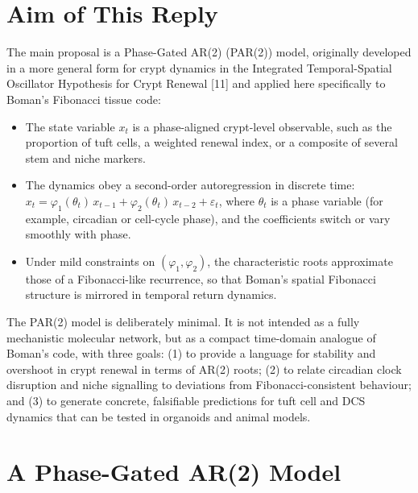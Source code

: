 \documentclass[]{interact}
\begin{document}
\section{Aim of This Reply}

The main proposal is a Phase-Gated AR(2) (PAR(2)) model, originally developed
in a more general form for crypt dynamics in the Integrated Temporal-Spatial
Oscillator Hypothesis for Crypt Renewal [11] and applied here specifically to
Boman's Fibonacci tissue code:

\begin{itemize}
  \item The state variable $x_t$ is a phase-aligned crypt-level observable,
        such as the proportion of tuft cells, a weighted renewal index, or a
        composite of several stem and niche markers.
  \item The dynamics obey a second-order autoregression in discrete time:
        $x_t = \varphi_1(\theta_t)\,x_{t-1} + \varphi_2(\theta_t)\,x_{t-2}
        + \varepsilon_t$, where $\theta_t$ is a phase variable (for example,
        circadian or cell-cycle phase), and the coefficients switch or vary
        smoothly with phase.
  \item Under mild constraints on $(\varphi_1, \varphi_2)$, the characteristic
        roots approximate those of a Fibonacci-like recurrence, so that Boman's
        spatial Fibonacci structure is mirrored in temporal return dynamics.
\end{itemize}

The PAR(2) model is deliberately minimal.
It is not intended as a fully mechanistic molecular network, but as a compact
time-domain analogue of Boman's code, with three goals:
(1) to provide a language for stability and overshoot in crypt renewal in
terms of AR(2) roots;
(2) to relate circadian clock disruption and niche signalling to deviations
from Fibonacci-consistent behaviour; and
(3) to generate concrete, falsifiable predictions for tuft cell and DCS
dynamics that can be tested in organoids and animal models.

\section{A Phase-Gated AR(2) Model}
\end{document}
